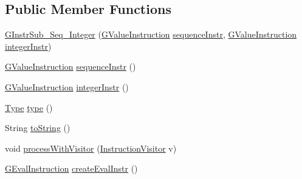 \subsection*{Public Member Functions}
\begin{DoxyCompactItemize}
\item 
\hyperlink{classorg_1_1tzi_1_1use_1_1gen_1_1assl_1_1statics_1_1_g_instr_sub___seq___integer_a935687d26ac3bc2521b1edc5ad002ac1}{G\-Instr\-Sub\-\_\-\-Seq\-\_\-\-Integer} (\hyperlink{interfaceorg_1_1tzi_1_1use_1_1gen_1_1assl_1_1statics_1_1_g_value_instruction}{G\-Value\-Instruction} \hyperlink{classorg_1_1tzi_1_1use_1_1gen_1_1assl_1_1statics_1_1_g_instr_sub___seq___integer_a0cd08d1b306b5080175bc96ea6b0c865}{sequence\-Instr}, \hyperlink{interfaceorg_1_1tzi_1_1use_1_1gen_1_1assl_1_1statics_1_1_g_value_instruction}{G\-Value\-Instruction} \hyperlink{classorg_1_1tzi_1_1use_1_1gen_1_1assl_1_1statics_1_1_g_instr_sub___seq___integer_a76992cde66fd8577556960e15ce236c9}{integer\-Instr})
\item 
\hyperlink{interfaceorg_1_1tzi_1_1use_1_1gen_1_1assl_1_1statics_1_1_g_value_instruction}{G\-Value\-Instruction} \hyperlink{classorg_1_1tzi_1_1use_1_1gen_1_1assl_1_1statics_1_1_g_instr_sub___seq___integer_a0cd08d1b306b5080175bc96ea6b0c865}{sequence\-Instr} ()
\item 
\hyperlink{interfaceorg_1_1tzi_1_1use_1_1gen_1_1assl_1_1statics_1_1_g_value_instruction}{G\-Value\-Instruction} \hyperlink{classorg_1_1tzi_1_1use_1_1gen_1_1assl_1_1statics_1_1_g_instr_sub___seq___integer_a76992cde66fd8577556960e15ce236c9}{integer\-Instr} ()
\item 
\hyperlink{interfaceorg_1_1tzi_1_1use_1_1uml_1_1ocl_1_1type_1_1_type}{Type} \hyperlink{classorg_1_1tzi_1_1use_1_1gen_1_1assl_1_1statics_1_1_g_instr_sub___seq___integer_a5bbfa80a9125870f036d3554d5795120}{type} ()
\item 
String \hyperlink{classorg_1_1tzi_1_1use_1_1gen_1_1assl_1_1statics_1_1_g_instr_sub___seq___integer_a273e831572bd103580ea069bfc6cc738}{to\-String} ()
\item 
void \hyperlink{classorg_1_1tzi_1_1use_1_1gen_1_1assl_1_1statics_1_1_g_instr_sub___seq___integer_aff542124eb781d1a997e03029ff069d2}{process\-With\-Visitor} (\hyperlink{interfaceorg_1_1tzi_1_1use_1_1gen_1_1assl_1_1statics_1_1_instruction_visitor}{Instruction\-Visitor} v)
\item 
\hyperlink{classorg_1_1tzi_1_1use_1_1gen_1_1assl_1_1dynamics_1_1_g_eval_instruction}{G\-Eval\-Instruction} \hyperlink{classorg_1_1tzi_1_1use_1_1gen_1_1assl_1_1statics_1_1_g_instr_sub___seq___integer_a9f1d892ada9c9dc20f2c8f9ddf1d1e7f}{create\-Eval\-Instr} ()
\end{DoxyCompactItemize}


